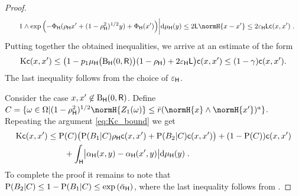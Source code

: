 \begin{proof}
\begin{align*}
&\qquad 1 \wedge \exp\parenthese{-\potU(\rhoH x'+ (1-\rhoH^2)^{1/2} y) + \potU(x')}\biggr| \rmd \muH(y) \leq  2\Lippcn\normH{x-x'} \leq 2\varepsilonH\Lippcn\cost(x,x')\eqsp.
\end{align*}
Putting together the obtained inequalities, we arrive at an estimate of the form
\begin{align*}
{\rm K} \mathsf{c}(x,x') \leq \bigl(1 - p_1 \mu_{\mathsf{H}}\bigl(\operatorname{B}_{\mathsf{H}}(0,\mathsf{R})\bigr)(1-\rho_{\mathsf{H}}) + 2 \varepsilon_{\mathsf{H}} \mathsf{L}\bigr)\mathsf{c}(x,x') \leq (1- \gamma)\mathsf{c}(x,x').
\end{align*}
The last inequality follows from the choice of $\varepsilon_{\mathsf{H}}$.
\par
Consider the case $x,x' \not \in \operatorname{B}_{\mathsf{H}}(0,\mathsf{R})$. Define $\eventC = \{\omega \in \RandSpace | (1-\rhoH^2)^{1/2}\normH{Z_1(\omega)} \leq \rpCNconst(\normH{x} \wedge \normH{x'})^{a}\}$. Repeating the argument \eqref{eq:Kc_bound} we get
\begin{align*}
{\rm K} \mathsf{c}(x,x')
&\leq \mathrm{P}(C)\bigl(\mathrm{P}(B_1|C)\rho_{\mathsf{H}}\mathsf{c}(x,x') + \mathrm{P}(B_2|C)\mathsf{c}(x,x')\bigr) + (1-\mathrm{P}(C))\mathsf{c}(x,x') \\
&\qquad +\int_{\mathsf{H}}\bigl|\alpha_{\mathsf{H}}(x,y) - \alpha_{\mathsf{H}}(x',y)\bigr| \mathrm{d} \mu_{\mathsf{H}}(y) \nonumber\;.
\end{align*}
To complete the proof it remains to note that $\mathrm{P}(B_2|C) \leq 1 - \mathrm{P}(B_1|C) \le \exp\left(\bar{\alpha}_{\mathsf{H}}\right)$, where the last inequality follows from .
\end{proof}


